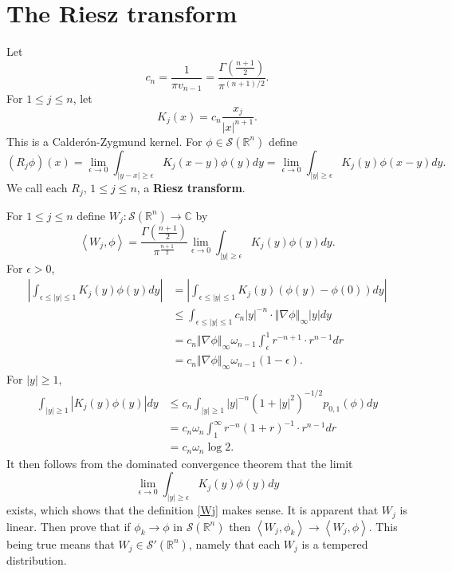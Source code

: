 \documentclass{article}
\newcommand{\inner}[2]{\left\langle #1, #2 \right\rangle}
\newcommand{\norm}[1]{\left\Vert #1 \right\Vert}
\theoremstyle{definition}
\begin{document}
\section{The Riesz transform}
Let
\[
c_n = \frac{1}{\pi v_{n-1}} = \frac{\Gamma\left(\frac{n+1}{2}\right)}{\pi^{(n+1)/2}}.
\]
For $1 \leq j \leq n$, let
\[
K_j(x) = c_n \frac{x_j}{|x|^{n+1}}.
\]
This is a Calder\'on-Zygmund kernel. 
For $\phi \in \mathscr{S}(\mathbb{R}^n)$ define
\[
(R_j \phi)(x) = \lim_{\epsilon \to 0} \int_{|y-x| \geq \epsilon} K_j(x-y) \phi(y) dy
=\lim_{\epsilon \to 0} \int_{|y| \geq \epsilon} K_j(y) \phi(x-y) dy.
\]
We call each $R_j$, $1 \leq j \leq n$, a \textbf{Riesz transform}. 





For $1 \leq j \leq n$ define $W_j:\mathscr{S}(\mathbb{R}^n) \to \mathbb{C}$ by
\begin{equation}
\inner{W_j}{\phi} = \frac{\Gamma\left(\frac{n+1}{2}\right)}{\pi^{\frac{n+1}{2}}} \lim_{\epsilon \to 0} \int_{|y| \geq \epsilon} K_j(y) \phi(y) dy.
\label{Wj}
\end{equation}
For $\epsilon>0$, 
\begin{align*}
\left| \int_{\epsilon \leq |y| \leq 1} K_j(y) \phi(y) dy \right|&=\left| \int_{\epsilon \leq |y| \leq 1} K_j(y)(\phi(y)-\phi(0)) dy \right|\\
&\leq \int_{\epsilon \leq |y| \leq 1} c_n |y|^{-n} \cdot \norm{\nabla \phi}_\infty |y| dy\\
&= c_n \norm{\nabla \phi}_\infty \omega_{n-1} \int_\epsilon^1 r^{-n+1} \cdot r^{n-1} dr\\
&=c_n \norm{\nabla \phi}_\infty \omega_{n-1} (1-\epsilon).
\end{align*}
For $|y| \geq 1$,
\begin{align*}
\int_{|y| \geq 1} |K_j(y) \phi(y)| dy &\leq c_n \int_{|y| \geq 1} |y|^{-n} (1+|y|^2)^{-1/2} p_{0,1}(\phi) dy\\
&=c_n \omega_n \int_1^\infty r^{-n} (1+r)^{-1} \cdot r^{n-1} dr\\
&=c_n \omega_n \log 2.
\end{align*}
It then follows from the dominated convergence theorem that the limit
\[
\lim_{\epsilon \to 0} \int_{|y| \geq \epsilon} K_j(y) \phi(y) dy
\]
exists, which shows that the definition \eqref{Wj} makes sense.
It is apparent that $W_j$ is linear.
Then prove that if $\phi_k \to \phi$ in $\mathscr{S}(\mathbb{R}^n)$ then
$\inner{W_j}{\phi_k} \to \inner{W_j}{\phi}$. This being true means that $W_j \in \mathscr{S}'(\mathbb{R}^n)$, namely
that each $W_j$ is a tempered distribution. 
\end{document}

